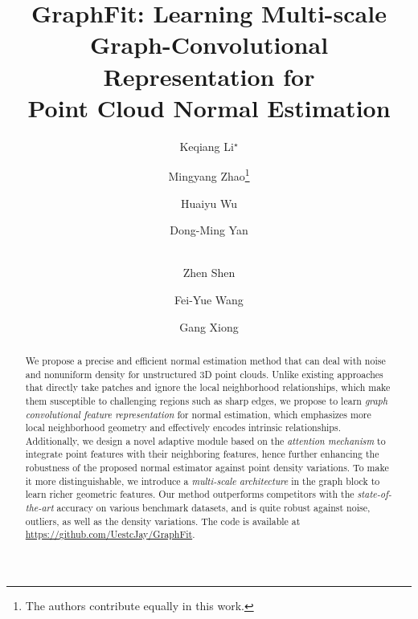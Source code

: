 \documentclass[runningheads]{llncs}
\begin{document}
\pagestyle{headings}
\mainmatter
\def\ECCVSubNumber{100}  

\title{GraphFit: Learning Multi-scale Graph-Convolutional Representation 
for \\ Point Cloud Normal Estimation} 



\begin{comment}
\titlerunning{ECCV-22 submission ID \ECCVSubNumber} 
\authorrunning{ECCV-22 submission ID \ECCVSubNumber} 
\author{Anonymous ECCV submission}
\institute{Paper ID \ECCVSubNumber}
\end{comment}


\author{Keqiang Li$^\star$ \and
Mingyang Zhao\thanks{The authors contribute equally in this work.} \and
Huaiyu Wu   \and
Dong-Ming Yan   \and \\
Zhen Shen   \and
Fei-Yue Wang  \and
Gang Xiong }



\maketitle
\begin{abstract}
We propose a precise and efficient normal estimation method that can deal with noise and nonuniform density for unstructured 3D point clouds. Unlike existing approaches that
directly take patches and ignore the local neighborhood relationships, which make them susceptible to challenging regions such as sharp edges, we propose to learn \emph{graph convolutional feature representation} for normal estimation, which emphasizes more local neighborhood geometry and effectively encodes intrinsic relationships. Additionally, we design a novel adaptive module based on the \emph{attention mechanism} to integrate point features with their neighboring features, hence further enhancing the robustness of the proposed normal estimator against point density variations. To make it more distinguishable, we  introduce a \emph{multi-scale architecture} in the graph block to learn richer  geometric features. Our method outperforms competitors with the \emph{state-of-the-art} accuracy on various benchmark datasets, and is quite robust against noise, outliers, as well as the density variations. The code is available at 
{\textcolor{blue}{\url{https://github.com/UestcJay/GraphFit}}}.
\end{abstract}
\end{document}
